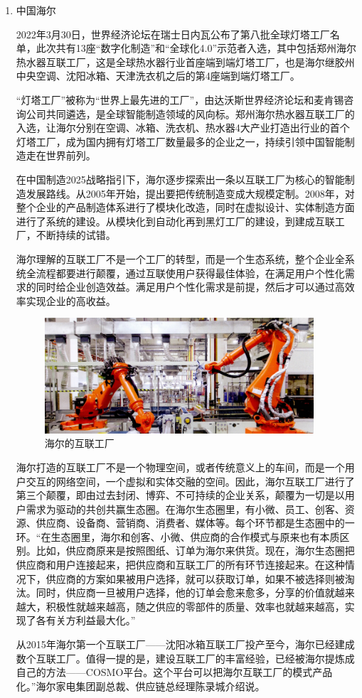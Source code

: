 \documentclass[lang=cn,12pt,bibtex,newtx,twoside,margintrue,citestyle=gb7714-2015, bibstyle=gb7714-2015]{elegantbook}
\begin{document}
\begin{enumerate}
\item 中国海尔
\label{sec:orgb7dd426}

2022年3月30日，世界经济论坛在瑞士日内瓦公布了第八批全球灯塔工厂名单，此次共有13座“数字化制造”和“全球化4.0”示范者入选，其中包括郑州海尔热水器互联工厂，这是全球热水器行业首座端到端灯塔工厂，也是海尔继胶州中央空调、沈阳冰箱、天津洗衣机之后的第4座端到端灯塔工厂。

“灯塔工厂”被称为“世界上最先进的工厂”，由达沃斯世界经济论坛和麦肯锡咨询公司共同遴选，是全球智能制造领域的风向标。郑州海尔热水器互联工厂的入选，让海尔分别在空调、冰箱、洗衣机、热水器4大产业打造出行业的首个灯塔工厂，成为国内拥有灯塔工厂数量最多的企业之一，持续引领中国智能制造走在世界前列。

在中国制造2025战略指引下，海尔逐步探索出一条以互联工厂为核心的智能制造发展路线。从2005年开始，提出要把传统制造变成大规模定制。2008年，对整个企业的产品制造体系进行了模块化改造，同时在虚拟设计、实体制造方面进行了系统的建设。从模块化到自动化再到黑灯工厂的建设，到建成互联工厂，不断持续的试错。

海尔理解的互联工厂不是一个工厂的转型，而是一个生态系统，整个企业全系统全流程都要进行颠覆，通过互联使用户获得最佳体验，在满足用户个性化需求的同时给企业创造效益。满足用户个性化需求是前提，然后才可以通过高效率实现企业的高收益。

\begin{figure}[htbp]
\centering
\includegraphics[angle=0,width=10cm]{./figure/4.7.png}
\caption{\label{4.7}海尔的互联工厂}
\end{figure}

海尔打造的互联工厂不是一个物理空间，或者传统意义上的车间，而是一个用户交互的网络空间，一个虚拟和实体交融的空间。因此，海尔互联工厂进行了第三个颠覆，即由过去封闭、博弈、不可持续的企业关系，颠覆为一切是以用户需求为驱动的共创共赢生态圈\cite{邓雅静2017}。在海尔生态圈里，有小微、员工、创客、资源、供应商、设备商、营销商、消费者、媒体等。每个环节都是生态圈中的一环。“在生态圈里，海尔和创客、小微、供应商的合作模式与原来也有本质区别。比如，供应商原来是按照图纸、订单为海尔来供货。现在，海尔生态圈把供应商和用户连接起来，把供应商和互联工厂的所有环节连接起来。在这种情况下，供应商的方案如果被用户选择，就可以获取订单，如果不被选择则被淘汰。同时，供应商一旦被用户选择，他的订单会愈来愈多，分享的价值就越来越大，积极性就越来越高，随之供应的零部件的质量、效率也就越来越高，实现了各有关方利益最大化。”

从2015年海尔第一个互联工厂——沈阳冰箱互联工厂投产至今，海尔已经建成数个互联工厂。值得一提的是，建设互联工厂的丰富经验，已经被海尔提炼成自己的方法——COSMO平台。这个平台可以把海尔互联工厂的模式产品化。”海尔家电集团副总裁、供应链总经理陈录城介绍说。


\printbibliography[heading=bibintoc,title=参考文献]
\end{enumerate}
\end{document}
